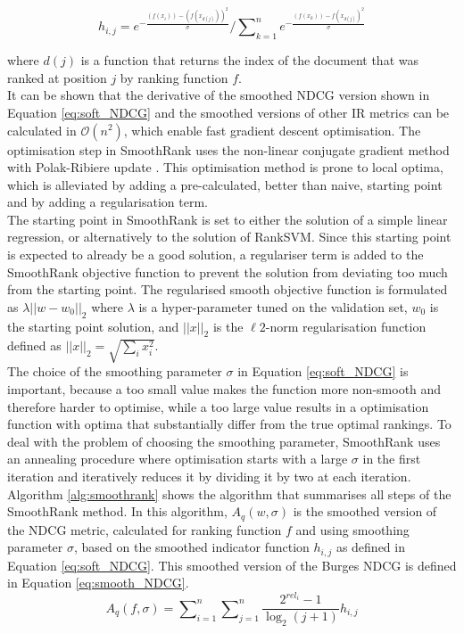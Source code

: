 \begin{equation}
h_{i,j} = e^{-\frac{(f(x_i))-(f(x_{d(j)}))^2}{\sigma}}\Big/\sum\nolimits_{k=1}^{n}e^{-\frac{(f(x_k))-f(x_{d(j)})^2}{\sigma}}
\label{eq:soft_NDCG}
\end{equation}

where $d(j)$ is a function that returns the index of the document that was ranked at position $j$ by ranking function $f$.\\

It can be shown that the derivative of the smoothed \ac{NDCG} version shown in Equation \ref{eq:soft_NDCG} and the smoothed versions of other \ac{IR} metrics can be calculated in $\mathcal{O}(n^2)$, which enable fast gradient descent optimisation. The optimisation step in SmoothRank uses the non-linear conjugate gradient method  with Polak-Ribiere update \cite{Shewchuk1994}. This optimisation method is prone to local optima, which is alleviated by adding a pre-calculated, better than naive, starting point and by adding a regularisation term.\\

The starting point in SmoothRank is set to either the solution of a simple linear regression, or alternatively to the solution of Rank\acs{SVM}. Since this starting point is expected to already be a good solution, a regulariser term is added to the SmoothRank objective function to prevent the solution from deviating too much from the starting point. The regularised smooth objective function is formulated as $\lambda||w-w_0||_2$ where $\lambda$ is a hyper-parameter tuned on the validation set, $w_0$ is the starting point solution, and $||x||_2$ is the $\ell2$-norm regularisation function defined as $||x||_2 = \sqrt{\sum\nolimits_ix_i^2}$.\\

The choice of the smoothing parameter $\sigma$ in Equation \ref{eq:soft_NDCG} is important, because a too small value makes the function more non-smooth and therefore harder to optimise, while a too large value results in a optimisation function with optima that substantially differ from the true optimal rankings. To deal with the problem of choosing the smoothing parameter, SmoothRank uses an annealing procedure where optimisation starts with a large $\sigma$ in the first iteration and iteratively reduces it by dividing it by two at each iteration.\\

Algorithm \ref{alg:smoothrank} shows the algorithm that summarises all steps of the SmoothRank method. In this algorithm, $A_q(w,\sigma)$ is the smoothed version of the \ac{NDCG} metric, calculated for ranking function $f$ and using smoothing parameter $\sigma$, based on the smoothed indicator function $h_{i,j}$ as defined in Equation \ref{eq:soft_NDCG}. This smoothed version of the Burges \ac{NDCG} is defined in Equation \ref{eq:smooth_NDCG}.
\begin{equation}
A_q(f,\sigma) = \sum\nolimits_{i=1}^{n} \sum\nolimits_{j=1}^{n} \frac{2^{rel_i}-1}{\log_2(j+1)} h_{i,j}
\label{eq:smooth_NDCG}
\end{equation}

